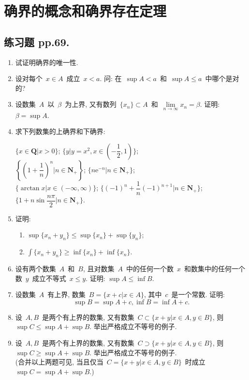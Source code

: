 \documentclass[UTF8,a4paper,10pt,twoside]{book}
\newcommand{\e}{\mathrm e}
\begin{document}
\section{确界的概念和确界存在定理}
\subsection{练习题 pp.69.}
\begin{enumerate}
	\item 试证明确界的唯一性.

	\item 设对每个~$x\in A$~成立~$x<a$. 问: 在~$\sup{A}<a$~和~$\sup{A}\leqslant a$~中哪个是对的?

	\item 设数集~$A$~以~$\beta$~为上界, 又有数列~$\{x_n\}\subset A$~和~$\lim\limits_{n\to\infty} x_n=\beta$. 证明: $\beta=\sup{A}$.

	\item 求下列数集的上确界和下确界:
	      \begin{tabenum}[(1)]
		      \tabenumitem $\{x\in\mathbf{Q}|x>0\}$;
		      \tabenumitem $\{y|y=x^2,x\in(-\dfrac{1}{2},1)\}$;\\
		      \tabenumitem $\left\{\left(1+\dfrac{1}{n}\right)^n | n\in\mathbf{N}_{+}\right\}$;
		      \tabenumitem $\{n\e^{-n}|n\in\mathbf{N}_{+}\}$;\\
		      \tabenumitem $\{\arctan{x}|x\in(-\infty,\infty)\}$;
		      \tabenumitem $\{(-1)^n+\dfrac{1}{n}(-1)^{n+1}|n\in\mathbf{N}_{+}\}$;\\
		      \tabenumitem $\{1+n\sin{\dfrac{n\pi}{2}}|n\in\mathbf{N}_{+}\}$.
	      \end{tabenum}

	\item 证明:
	      \begin{enumerate}[(1)]
		      \item $\sup\{x_n+y_n\}\leqslant\sup\{x_n\}+\sup\{y_n\}$;
		      \item $\int\{x_n+y_n\}\geqslant\inf\{x_n\}+\inf\{x_n\}$.
	      \end{enumerate}

	\item 设有两个数集~$A$~和~$B$, 且对数集~$A$~中的任何一个数~$x$~和数集中的任何一个数~$y$~成立不等式~$x\leqslant y$. 证明: $\sup{A}\leqslant\inf{B}$.

	\item 设数集~$A$~有上界, 数集~$B=\{x+c|x\in A\}$, 其中~$c$~是一个常数. 证明:
	      \[
		      \sup{B}=\sup{A}+c, \inf{B}=\inf{A}+c.
	      \]

	\item 设~$A,B$~是两个有上界的数集, 又有数集~$C\subset\{x+y|x\in A, y\in B\}$, 则~$\sup{C}\leqslant\sup{A}+\sup{B}$. 举出严格成立不等号的例子.

	\item 设~$A,B$~是两个有上界的数集, 又有数集~$C\supset\{x+y|x\in A, y\in B\}$, 则~$\sup{C}\geqslant\sup{A}+\sup{B}$. 举出严格成立不等号的例子.\\

	      (合并以上两题可见, 当且仅当~$C=\{x+y|x\in A, y\in B\}$~时成立~$\sup{C}=\sup{A}+\sup{B}$.)
\end{enumerate}
\end{document}
